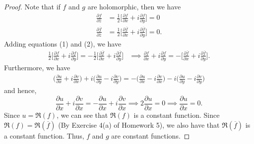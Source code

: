 \documentclass[a4paper]{article}
\begin{document}
\begin{enumerate}
\begin{proof}
        Note that if \( f  \) and \( g  \) are holomorphic, then we have
        \begin{align*}
            \frac{ \partial f  }{  \partial \overline{z} } &= \frac{ 1 }{ 2 }  \Big[ \frac{ \partial f  }{  \partial x  }  + i \frac{ \partial f  }{  \partial y  } \Big] = 0 \tag{1}  \\
            \frac{ \partial \overline{f} }{ \partial \overline{z } } &= \frac{ 1 }{ 2 }  \Big[ \frac{ \partial \overline{f} }{ \partial x  }  + i \frac{ \partial \overline{f} }{ \partial y  } \Big] = 0 \tag{2}. 
        \end{align*}
        Adding equations (1) and (2), we have 
        \begin{align*}
            \frac{ 1 }{ 2 }  \Big[ \frac{\partial f }{\partial x }  + i \frac{\partial f }{\partial y } \Big] = - \frac{ 1 }{ 2 }  \Big[ \frac{\partial \overline{f} }{\partial x }  + i \frac{\partial \overline{f} }{\partial y } \Big] &\implies \frac{\partial f }{\partial x }  + i \frac{\partial f }{\partial y }  = -\Big[ \frac{\partial \overline{f} }{\partial x  }  + i \frac{\partial \overline{f} }{\partial y } \Big].
        \end{align*} 
        Furthermore, we have 
        \begin{align*}
          \Big(  \frac{\partial u }{\partial x }  + i \frac{\partial v }{\partial x }   \Big) + i \Big( \frac{\partial u }{\partial y }  - i \frac{\partial v }{\partial y }    \Big) = -\Big(  \frac{\partial u }{\partial x }  - i \frac{\partial v }{\partial x }  \Big) - i  \Big( \frac{\partial u }{\partial y } - i\frac{\partial v }{\partial y }    \Big)   
        \end{align*}
        and hence,
        \[  \frac{\partial u }{\partial x }  + i \frac{\partial v }{\partial x }  = - \frac{\partial u }{\partial x }  + i \frac{\partial v }{\partial x } \implies 2 \frac{\partial u }{\partial x }  = 0 \implies \frac{\partial u }{\partial x }  = 0.    \]
        Since \( u = \Re(f) \), we can see that \( \Re(f) \) is a constant function. Since \( \Re(f) = \Re(\overline{f}) \) (By Exercise 4(a) of Homework 5), we also have that \( \Re(\overline{f}) \) is a constant function. Thus, \( f  \) and \( g  \) are constant functions.


\end{proof}
\end{enumerate}
\end{document}
